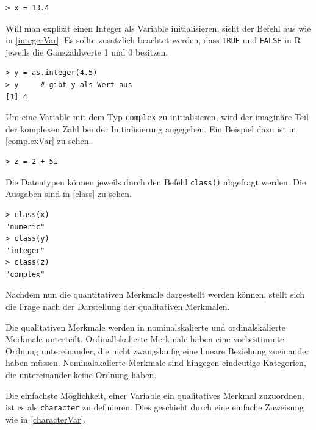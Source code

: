 \documentclass[a4paper, 12pt]{report} %
\begin{document}
\lstset{language=R}
\begin{lstlisting}[frame=single,caption={Deklarierung einer numerischen Variable x}]
> x = 13.4
\end{lstlisting}
\label{numericVar}

Will man explizit einen Integer als Variable initialisieren, sieht der Befehl aus wie in \ref{integerVar}. Es sollte zusätzlich beachtet werden, dass \texttt{TRUE} und \texttt{FALSE} in R jeweils die Ganzzahlwerte 1 und 0 besitzen. 

\lstset{language=R}
\begin{lstlisting}[frame=single,caption={Deklarierung einer ganzzahligen Variable y}]
> y = as.integer(4.5)
> y 	# gibt y als Wert aus 
[1] 4
\end{lstlisting}
\label{integerVar}

Um eine Variable mit dem Typ \texttt{complex} zu initialisieren, wird der imaginäre Teil der komplexen Zahl bei der Initialisierung angegeben. Ein Beispiel dazu ist in \ref{complexVar} zu sehen.

\lstset{language=R}
\begin{lstlisting}[frame=single,caption={Deklarierung einer komplexen Variable z}]
> z = 2 + 5i
\end{lstlisting}
\label{complexVar}

Die Datentypen können jeweils durch den Befehl \texttt{class()} abgefragt werden. Die Ausgaben sind in \ref{class} zu sehen. 

\lstset{language=R}
\begin{lstlisting}[frame=single,caption={Abfrage des Datentypen}]
> class(x)
"numeric"
> class(y)
"integer"
> class(z)
"complex"
\end{lstlisting}
\label{class}

Nachdem nun die quantitativen Merkmale dargestellt werden können, stellt sich die Frage nach der Darstellung der qualitativen Merkmalen. 

Die qualitativen Merkmale werden in nominalskalierte und ordinalskalierte Merkmale unterteilt. Ordinallskalierte Merkmale haben eine vorbestimmte Ordnung untereinander, die nicht zwangsläufig eine lineare Beziehung zueinander haben müssen. Nominalskalierte Merkmale sind hingegen eindeutige Kategorien, die untereinander keine Ordnung haben. 

Die einfachste Möglichkeit, einer Variable ein qualitatives Merkmal zuzuordnen, ist es als \texttt{character} zu definieren. Dies geschieht durch eine einfache Zuweisung wie in \ref{characterVar}.
\end{document}
